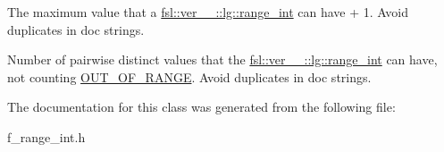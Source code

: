 The maximum value that a \mbox{\hyperlink{classfsl_1_1ver__1__0_1_1lg_1_1range__int}{fsl\+::ver\+\_\+\_\+::lg\+::range\+\_\+int}} can have + 1. Avoid duplicates in doc strings. 

Number of pairwise distinct values that the \mbox{\hyperlink{classfsl_1_1ver__1__0_1_1lg_1_1range__int}{fsl\+::ver\+\_\+\_\+::lg\+::range\+\_\+int}} can have, not counting \mbox{\hyperlink{classfsl_1_1ver__1__0_1_1lg_1_1range__int_a4262605b56b8b319c33b0d1ccb190a82}{O\+U\+T\+\_\+\+O\+F\+\_\+\+R\+A\+N\+GE}}. Avoid duplicates in doc strings. 

The documentation for this class was generated from the following file\+:\begin{DoxyCompactItemize}
\item 
f\+\_\+range\+\_\+int.\+h\end{DoxyCompactItemize}
